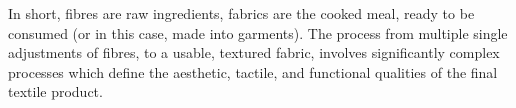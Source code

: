 In short, fibres are raw ingredients, fabrics are the cooked meal, ready to be consumed (or in this case, made into garments). The process from multiple single adjustments of fibres, to a usable, textured fabric, involves significantly complex processes which define the aesthetic, tactile, and functional qualities of the final textile product.